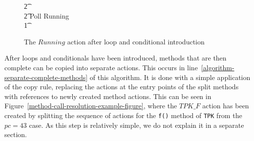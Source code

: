 \begin{figure}[t!]
\begin{circus}
    \t2 {} \cdots {} \\
    \t2 \circfi \circseq Poll \circseq Running \\
    \t1 \circfi
  \end{circus}
  \caption{The $Running$ action after loop and conditional introduction}
  \label{loop-and-conditional-introduction-example-figure}
\end{figure}

After loops and conditionals have been introduced, methods that are
then complete can be copied into separate actions.
This occurs in line~\ref{algorithm-separate-complete-methods} of this
algorithm.
It is done with a simple application of the copy rule, replacing the
actions at the entry points of the split methods with references to
newly created method actions.
This can be seen in
Figure~\ref{method-call-resolution-example-figure}, where the $TPK\_F$
action has been created by splitting the sequence of actions for the
\texttt{f()} method of \texttt{TPK} from the $pc = 43$ case.
As this step is relatively simple, we do not explain it in a separate
section.
